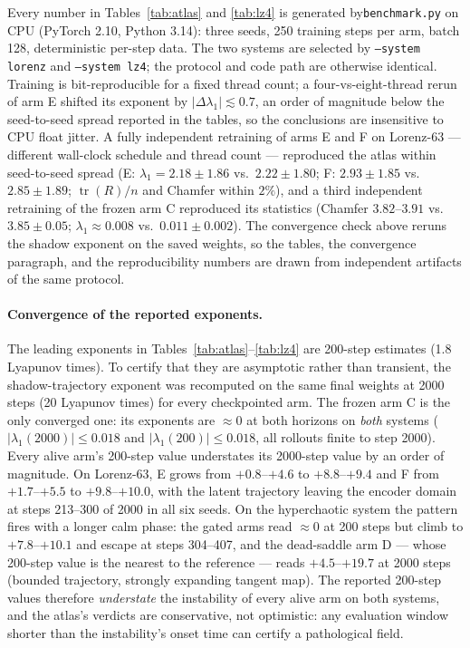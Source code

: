 \documentclass[journal]{IEEEtran}
\newcommand{\tr}{\operatorname{tr}}
\begin{document}
Every number in Tables~\ref{tab:atlas} and \ref{tab:lz4} is generated
by\texttt{benchmark.py} on CPU (PyTorch 2.10, Python 3.14): three
seeds, 250 training steps per arm, batch 128, deterministic per-step
data. The two systems are selected by \texttt{--system lorenz} and
\texttt{--system lz4}; the protocol and code path are otherwise
identical. Training is bit-reproducible for a fixed thread count; a
four-vs-eight-thread rerun of arm E shifted its exponent by
$|\Delta\lambda_1|\lesssim0.7$, an order of magnitude below the
seed-to-seed spread reported in the tables, so the conclusions are
insensitive to CPU float jitter. A fully independent retraining of
arms E and F on Lorenz-63 --- different wall-clock schedule and thread
count --- reproduced the atlas within seed-to-seed spread (E:
$\lambda_1=2.18\pm1.86$ vs.\ $2.22\pm1.80$; F: $2.93\pm1.85$ vs.\
$2.85\pm1.89$; $\tr(R)/n$ and Chamfer within $2\%$), and a third
independent retraining of the frozen arm C reproduced its statistics
(Chamfer $3.82$--$3.91$ vs.\ $3.85\pm0.05$; $\lambda_1\approx0.008$
vs.\ $0.011\pm0.002$). The convergence
check above reruns the shadow exponent on the saved weights, so the
tables, the convergence paragraph, and the reproducibility numbers are
drawn from independent artifacts of the same protocol.

\paragraph{Convergence of the reported exponents.}
The leading exponents in Tables~\ref{tab:atlas}--\ref{tab:lz4} are
200-step estimates (1.8 Lyapunov times). To certify that they are
asymptotic rather than transient, the shadow-trajectory exponent was
recomputed on the same final weights at 2000 steps (20 Lyapunov times)
for every checkpointed arm. The frozen arm C is the only converged
one: its exponents are $\approx0$ at both horizons on \emph{both}
systems ($|\lambda_1(2000)|\le0.018$ and $|\lambda_1(200)|\le0.018$,
all rollouts finite to step 2000). Every alive arm's 200-step value
understates its
2000-step value by an order of magnitude. On Lorenz-63, E grows from
$+0.8$--$+4.6$ to $+8.8$--$+9.4$ and F from $+1.7$--$+5.5$ to
$+9.8$--$+10.0$, with the latent trajectory leaving the encoder domain
at steps 213--300 of 2000 in all six seeds. On the hyperchaotic system
the pattern fires with a longer calm phase: the gated arms read
$\approx0$ at 200 steps but climb to $+7.8$--$+10.1$ and escape at
steps 304--407, and the dead-saddle arm D --- whose 200-step value is
the nearest to the reference --- reads $+4.5$--$+19.7$ at 2000 steps
(bounded trajectory, strongly expanding tangent map). The reported
200-step values therefore \emph{understate} the instability of every
alive arm on both systems, and the atlas's verdicts are conservative,
not optimistic: any evaluation window shorter than the instability's
onset time can certify a pathological field.
\end{document}
